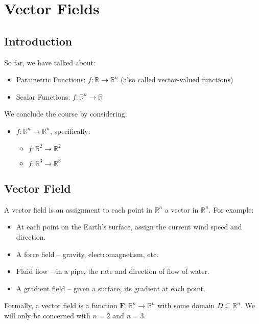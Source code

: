 \section{Vector Fields}

\subsection{Introduction}
So far, we have talked about:

\begin{itemize}
    \item Parametric Functions: \( f \colon \mathbb{R} \to \mathbb{R}^n \) (also called vector-valued functions)
    \item Scalar Functions: \( f \colon \mathbb{R}^n \to \mathbb{R} \)
\end{itemize}

We conclude the course by considering:

\begin{itemize}
    \item \( f \colon \mathbb{R}^n \to \mathbb{R}^n \), specifically:
    \begin{itemize}
        \item \( f \colon \mathbb{R}^2 \to \mathbb{R}^2 \)
        \item \( f \colon \mathbb{R}^3 \to \mathbb{R}^3 \)
    \end{itemize}
\end{itemize}

\subsection{Vector Field}
A vector field is an assignment to each point in \( \mathbb{R}^n \) a vector in \( \mathbb{R}^n \). For example:

\begin{itemize}
    \item At each point on the Earth's surface, assign the current wind speed and direction.
    \item A force field – gravity, electromagnetism, etc.
    \item Fluid flow – in a pipe, the rate and direction of flow of water.
    \item A gradient field – given a surface, its gradient at each point.
\end{itemize}

Formally, a vector field is a function \( \mathbf{F} : \mathbb{R}^n \to \mathbb{R}^n \) with some domain \( D \subseteq \mathbb{R}^n \). We will only be concerned with \( n = 2 \) and \( n = 3 \). \\

